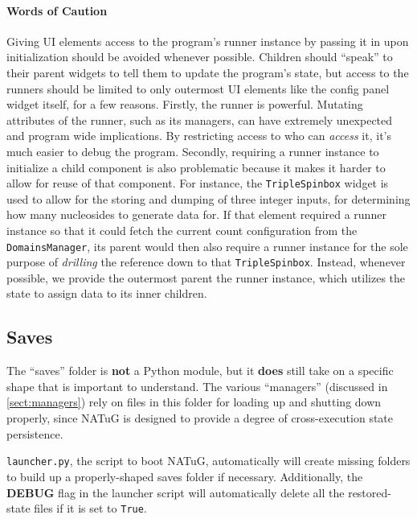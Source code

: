 \documentclass[titlepage]{article}
\begin{document}
	\paragraph{Words of Caution} Giving UI elements access to the program's runner instance by passing it in upon initialization should be avoided whenever possible. Children should ``speak'' to their parent widgets to tell them to update the program's state, but access to the runners should be limited to only outermost UI elements like the config panel widget itself, for a few reasons. Firstly, the runner is powerful. Mutating attributes of the runner, such as its managers, can have extremely unexpected and program wide implications. By restricting access to who can \textit{access} it, it's much easier to debug the program. Secondly, requiring a runner instance to initialize a child component is also problematic because it makes it harder to allow for reuse of that component. For instance, the \texttt{TripleSpinbox} widget is used to allow for the storing and dumping of three integer inputs, for determining how many nucleosides to generate data for. If that element required a runner instance so that it could fetch the current count configuration from the \texttt{DomainsManager}, its parent would then also require a runner instance for the sole purpose of \textit{drilling} the reference down to that \texttt{TripleSpinbox}. Instead, whenever possible, we provide the outermost parent the runner instance, which utilizes the state to assign data to its inner children.
	
	\subsection{Saves}
	The ``saves'' folder is \textbf{not} a Python module, but it \textbf{does} still take on a specific shape that is important to understand. The various ``managers'' (discussed in \ref{sect:managers}) rely on files in this folder for loading up and shutting down properly, since NATuG is designed to provide a degree of cross-execution state persistence.
	
	\texttt{launcher.py}, the script to boot NATuG, automatically will create missing folders to build up a properly-shaped saves folder if necessary. Additionally, the \textbf{DEBUG} flag in the launcher script will automatically delete all the restored-state files if it is set to \texttt{True}.
	
\end{document}
